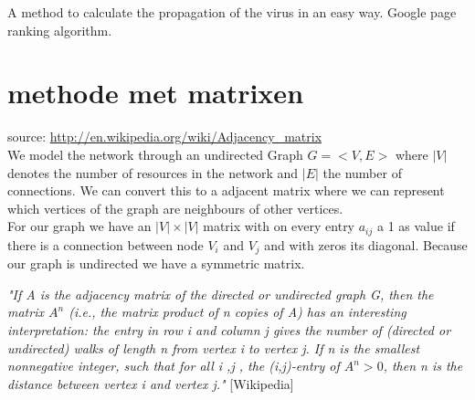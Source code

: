 A method to calculate the propagation of the virus in an easy way. Google page ranking algorithm. 


\section{methode met matrixen}



source: \url{http://en.wikipedia.org/wiki/Adjacency_matrix} \\
We model the network through an undirected Graph $G = < V, E> $ where $|V|$ denotes the number of resources in the network and $|E|$ the number of connections. We can convert this to a adjacent matrix where we can represent which vertices of the graph are neighbours of other vertices. \\
For our graph we have an $|V| \times |V|$ matrix with on every entry $a_{ij}$ a 1 as value if there is a connection between node $V_{i}$ and $V_{j}$ and with zeros its diagonal. Because our graph is undirected we have a symmetric matrix. 

\textit{"If \textit{A} is the adjacency matrix of the directed or undirected graph \textit{G}, then the matrix $A^{n}$ (i.e., the matrix product of n copies of \textit{A}) has an interesting interpretation: the entry in row i and column j gives the number of (directed or undirected) walks of length n from vertex i to vertex j. If n is the smallest nonnegative integer, such that for all i ,j , the (i,j)-entry of $A^{n} > 0$, then n is the distance between vertex i and vertex j."} [Wikipedia]

